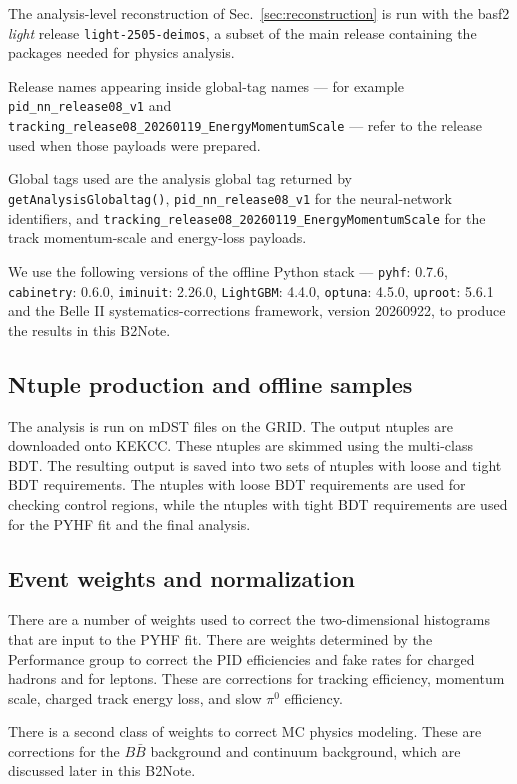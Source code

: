 The analysis-level reconstruction of Sec.~\ref{sec:reconstruction} is run with
the basf2 \emph{light} release \texttt{light-2505-deimos}, a subset of the main
release containing the packages needed for physics analysis.


Release names appearing inside global-tag names --- for example
\texttt{pid\_nn\_release08\_v1} and
\texttt{tracking\_release08\_20260119\_EnergyMomentumScale} --- refer to the
release used when those payloads were prepared.


Global tags used are the analysis global tag returned by
\texttt{getAnalysisGlobaltag()}, \texttt{pid\_nn\_release08\_v1} for the
neural-network identifiers, and
\texttt{tracking\_release08\_20260119\_EnergyMomentumScale} for the track
momentum-scale and energy-loss payloads.


We use the following versions of the offline Python stack --- \texttt{pyhf}: 0.7.6,
\texttt{cabinetry}: 0.6.0, \texttt{iminuit}: 2.26.0, \texttt{LightGBM}: 4.4.0, \texttt{optuna}: 4.5.0,
\texttt{uproot}: 5.6.1 and the Belle II systematics-corrections framework, version 20260922, to produce
the results in this B2Note.

\subsection{Ntuple production and offline samples}
\label{sec:data:ntuples}

The analysis is run on mDST files on the GRID. The output ntuples are downloaded onto KEKCC. These ntuples are skimmed using the multi-class BDT. The resulting output is saved into two sets of
ntuples with loose and tight BDT requirements.
The ntuples with loose BDT requirements are used for checking control regions, while the ntuples with tight BDT requirements are used for the PYHF fit and the final analysis.



\subsection{Event weights and normalization}
\label{sec:data:weights}

There are a number of weights used to correct the two-dimensional histograms that are input to the PYHF fit.
There are weights determined by the Performance group to correct the PID efficiencies and fake rates
for charged hadrons and for leptons.
These are corrections for tracking efficiency, momentum scale, charged track energy loss, and slow $\pi^0$ efficiency.

There is a second class of weights to correct MC physics modeling. 
These are corrections for the
$B\bar{B}$ background and 
continuum background, which are discussed later in this B2Note.











